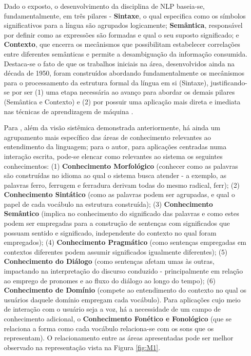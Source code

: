 Dado o exposto, o desenvolvimento da disciplina de NLP baseia-se, fundamentalmente, em três pilares - \textbf{Sintaxe}, o qual especifica como os símbolos significativos para a língua são agrupados logicamente; \textbf{Semântica}, responsável por definir como as expressões são formadas e qual o seu suposto significado; e \textbf{Contexto}, que encerra os mecânismos que possibilitam estabelecer correlações entre diferentes semânticas e permite a desambiguação da informação consumida. Destaca-se o fato de que os trabalhos iniciais na área, desenvolvidos ainda na década de 1950, foram construídos abordando fundamentalmente os mecânismos para o processamento da estrutura formal da língua em si (Sintaxe), justificando-se por ser (1) uma etapa necessária ao avanço para abordar os demais pilares (Semântica e Contexto) e (2) por possuir uma aplicação mais direta e imediata nas técnicas de aprendizagem de máquina \cite{cambria2014jumping}.



Para , além da visão sistêmica demonstrada anteriormente, há ainda um agrupamento mais específico das áreas de conhecimento relevantes ao entendimento da linguagem; para o autor, para aplicações centradas numa interação escrita, pode-se elencar como relevantes ao sistema os seguintes conhecimentos: (1) \textbf{Conhecimento Morfológico} (conhecer como as palavras são construídas no idioma ao qual o sistema busca atender - a exemplo, as palavras ferro, ferrugem e ferradura derivam todas do mesmo radical, ferr); (2) \textbf{Conhecimento Sintático} (como as palavras podem ser agrupadas, e qual o papel de cada vocábulo na estrutura construída); (3) \textbf{Conhecimento Semântico} (implica no conhecimento do significado das palavras e como estes podem ser empregadas para a construção de sentenças com significados que possuam sentido e significado, independente do contexto no qual foram empregados); (4) \textbf{Conhecimento Pragmático} (como sentenças empregadas em contextos diferentes podem assumir significados igualmente diferentes); (5) \textbf{Conhecimento do Diálogo} (como sentenças afetam umas às outras, impactando na interpretação do discurso conduzido - principalmente em relação ao emprego de pronomes e ao fluxo do diálogo ao longo do tempo); (6) \textbf{Conhecimento de Domínio} (compete ao entendimento do contexto no qual os usuários daquele domínio empregam cada vocábulo). Para aplicações cujo meio de interação com o usuário seja a voz, há a necessidade de um campo de conhecimento adicional, o \textbf{Conhecimento Fonético e Fonológico} (que se relaciona a forma como cada vocábulo relaciona-se com os sons que os representam). O relacionamento entre as áreas apresentadas pode ser melhor observado na representação vista na Figura \ref{fig:M1}.

